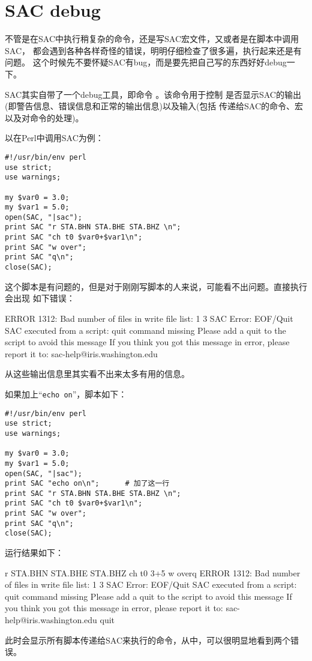 \section{SAC debug}
不管是在SAC中执行稍复杂的命令，还是写SAC宏文件，又或者是在脚本中调用SAC，
都会遇到各种各样奇怪的错误，明明仔细检查了很多遍，执行起来还是有问题。
这个时候先不要怀疑SAC有bug，而是要先把自己写的东西好好debug一下。

SAC其实自带了一个debug工具，即命令 。该命令用于控制
是否显示SAC的输出(即警告信息、错误信息和正常的输出信息)以及输入(包括
传递给SAC的命令、宏以及对命令的处理)。

以在Perl中调用SAC为例：
\begin{verbatim}
#!/usr/bin/env perl
use strict;
use warnings;

my $var0 = 3.0;
my $var1 = 5.0;
open(SAC, "|sac");
print SAC "r STA.BHN STA.BHE STA.BHZ \n";
print SAC "ch t0 $var0+$var1\n";
print SAC "w over";
print SAC "q\n";
close(SAC);
\end{verbatim}

这个脚本是有问题的，但是对于刚刚写脚本的人来说，可能看不出问题。直接执行会出现
如下错误：
\begin{SACCode}
 ERROR 1312: Bad number of files in write file list: 1 3
SAC Error: EOF/Quit
     SAC executed from a script: quit command missing
     Please add a quit to the script to avoid this message
     If you think you got this message in error,
     please report it to: sac-help@iris.washington.edu
\end{SACCode}
从这些输出信息里其实看不出来太多有用的信息。

如果加上``\texttt{echo on}''，脚本如下：
\begin{verbatim}
#!/usr/bin/env perl
use strict;
use warnings;

my $var0 = 3.0;
my $var1 = 5.0;
open(SAC, "|sac");
print SAC "echo on\n";      # 加了这一行
print SAC "r STA.BHN STA.BHE STA.BHZ \n";
print SAC "ch t0 $var0+$var1\n";
print SAC "w over";
print SAC "q\n";
close(SAC);
\end{verbatim}

运行结果如下：
\begin{SACCode}
 r STA.BHN STA.BHE STA.BHZ
 ch t0 3+5
 w overq
 ERROR 1312: Bad number of files in write file list: 1 3
SAC Error: EOF/Quit
     SAC executed from a script: quit command missing
     Please add a quit to the script to avoid this message
     If you think you got this message in error,
     please report it to: sac-help@iris.washington.edu
 quit
\end{SACCode}
此时会显示所有脚本传递给SAC来执行的命令，从中，可以很明显地看到两个错误。


